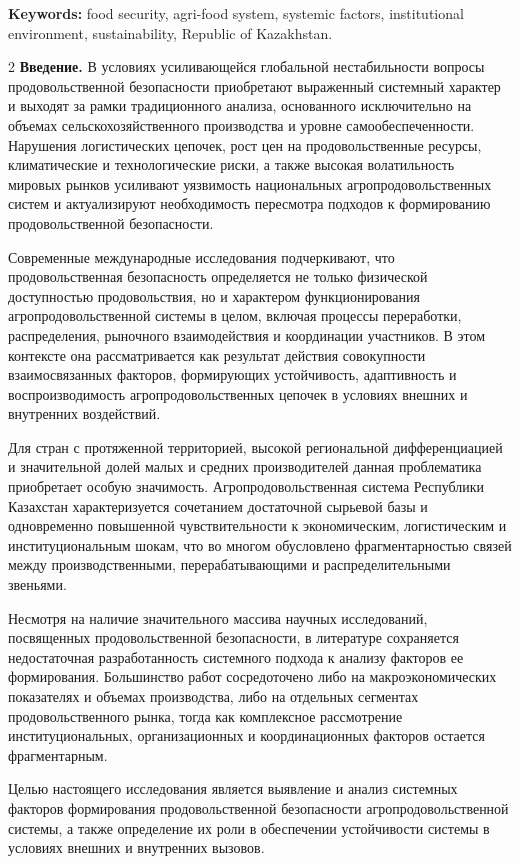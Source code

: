 {\bfseries Keywords:} food security, agri-food system, systemic factors,
institutional environment, sustainability, Republic of Kazakhstan.

\begin{multicols}{2}
{\bfseries Введение.} В условиях усиливающейся глобальной нестабильности
вопросы продовольственной безопасности приобретают выраженный системный
характер и выходят за рамки традиционного анализа, основанного
исключительно на объемах сельскохозяйственного производства и уровне
самообеспеченности. Нарушения логистических цепочек, рост цен на
продовольственные ресурсы, климатические и технологические риски, а
также высокая волатильность мировых рынков усиливают уязвимость
национальных агропродовольственных систем и актуализируют необходимость
пересмотра подходов к формированию продовольственной безопасности.

Современные международные исследования подчеркивают, что
продовольственная безопасность определяется не только физической
доступностью продовольствия, но и характером функционирования
агропродовольственной системы в целом, включая процессы переработки,
распределения, рыночного взаимодействия и координации участников. В этом
контексте она рассматривается как результат действия совокупности
взаимосвязанных факторов, формирующих устойчивость, адаптивность и
воспроизводимость агропродовольственных цепочек в условиях внешних и
внутренних воздействий.

Для стран с протяженной территорией, высокой региональной
дифференциацией и значительной долей малых и средних производителей
данная проблематика приобретает особую значимость. Агропродовольственная
система Республики Казахстан характеризуется сочетанием достаточной
сырьевой базы и одновременно повышенной чувствительности к
экономическим, логистическим и институциональным шокам, что во многом
обусловлено фрагментарностью связей между производственными,
перерабатывающими и распределительными звеньями.

Несмотря на наличие значительного массива научных исследований,
посвященных продовольственной безопасности, в литературе сохраняется
недостаточная разработанность системного подхода к анализу факторов ее
формирования. Большинство работ сосредоточено либо на макроэкономических
показателях и объемах производства, либо на отдельных сегментах
продовольственного рынка, тогда как комплексное рассмотрение
институциональных, организационных и координационных факторов остается
фрагментарным.

Целью настоящего исследования является выявление и анализ системных
факторов формирования продовольственной безопасности
агропродовольственной системы, а также определение их роли в обеспечении
устойчивости системы в условиях внешних и внутренних вызовов.


\end{multicols}
